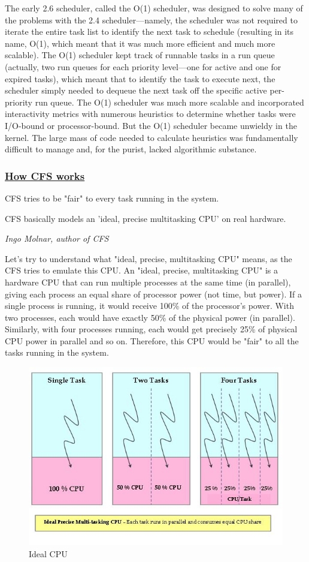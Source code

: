 \documentclass{article}
\begin{document}
The early 2.6 scheduler, called the O(1) scheduler, was designed to solve many of the problems with the 2.4 scheduler—namely, the scheduler was not required to iterate the entire task list to identify the next task to schedule (resulting in its name, O(1), which meant that it was much more efficient and much more scalable). The O(1) scheduler kept track of runnable tasks in a run queue (actually, two run queues for each priority level—one for active and one for expired tasks), which meant that to identify the task to execute next, the scheduler simply needed to dequeue the next task off the specific active per-priority run queue. The O(1) scheduler was much more scalable and incorporated interactivity metrics with numerous heuristics to determine whether tasks were I/O-bound or processor-bound. But the O(1) scheduler became unwieldy in the kernel. The large mass of code needed to calculate heuristics was fundamentally difficult to manage and, for the purist, lacked algorithmic substance.

\subsubsection{\underline{How CFS works}}

CFS tries to be "fair" to every task running in the system.

\epigraph{CFS basically models an 'ideal, precise multitasking CPU' on real hardware.}{\textit{Ingo Molnar, author of CFS}}

Let's try to understand what "ideal, precise, multitasking CPU" means, as the CFS tries to emulate this CPU. An "ideal, precise, multitasking CPU" is a hardware CPU that can run multiple processes at the same time (in parallel), giving each process an equal share of processor power (not time, but power). If a single process is running, it would receive 100\% of the processor's power. With two processes, each would have exactly 50\% of the physical power (in parallel). Similarly, with four processes running, each would get precisely 25\% of physical CPU power in parallel and so on. Therefore, this CPU would be "fair" to all the tasks running in the system.

\begin{figure}[H]
  \center
  \includegraphics[width=0.7\columnwidth]{./pics/cpu0.jpg}
  \caption{Ideal CPU}
  \label{fig:Ideal CPU}
\end{figure}
\end{document}
